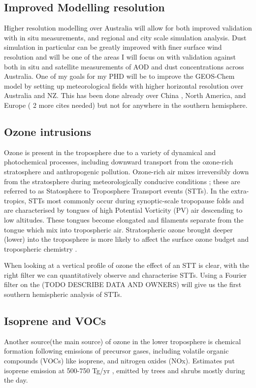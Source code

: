 \subsection{Improved Modelling resolution}
Higher resolution modelling over Australia will allow for both improved validation with in situ measurements, and regional and city scale simulation analysis. 
Dust simulation in particular can be greatly improved with finer surface wind resolution and will be one of the areas I will focus on with validation against both in situ and satellite measurements of AOD and dust concentrations across Australia.
One of my goals for my PHD will be to improve the GEOS-Chem model by setting up meteorological fields with higher horizontal resolution over Australia and NZ.
This has been done already over China \cite{Chen_2009}, North America, and Europe ( 2 more cites needed) but not for anywhere in the southern hemisphere.

\subsection{Ozone intrusions}
Ozone is present in the troposphere due to a variety of dynamical and photochemical processes, including downward  transport from the ozone-rich stratosphere and anthropogenic pollution.
Ozone-rich air mixes irreversibly down from the stratosphere during meteorologically conducive conditions \citep{Sprenger2003,Mihalikova2012}; these are referred to as Statosphere to Troposphere Transport events (STTs). 
In the extra-tropics, STTs most commonly occur during synoptic-scale tropopause folds \citep{Sprenger2003} and are characterised by tongues of high Potential Vorticity (PV) air descending to low altitudes.
These tongues become elongated and filaments separate from the tongue which mix into tropospheric air.
Stratospheric ozone brought deeper (lower) into the troposphere is more likely to affect the surface ozone budget and tropospheric chemistry \citep{Zanis2003,Langford_2009}.

When looking at a vertical profile of ozone the effect of an STT is clear, with the right filter we can quantitatively observe and characterise STTs.
Using a Fourier filter on the (TODO DESCRIBE DATA AND OWNERS) will give us the first southern hemispheric analysis of STTs.

\subsection{Isoprene and VOCs}
Another source(the main source) of ozone in the lower troposphere is chemical formation following emissions of precursor gases, including volatile organic compounds (VOCs) like isoprene, and nitrogen oxides (NOx).
Estimates put isoprene emission at 500-750 Tg/yr \cite{Guenther_2006}, emitted by trees and shrubs mostly during the day.


